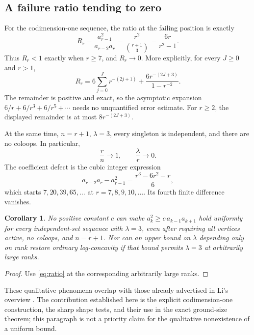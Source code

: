 \documentclass[11pt,letterpaper]{article}
\numberwithin{equation}{section}
\newtheorem{corollary}[theorem]{Corollary}
\theoremstyle{definition}
\theoremstyle{remark}
\begin{document}
\subsection{A failure ratio tending to zero}
For the codimension-one sequence, the ratio at the failing position is
exactly
\begin{equation}\label{eq:ratio}
 R_r=\frac{a_{r-1}^2}{a_{r-2}a_r}
 =\frac{r^2}{\binom{r+1}{3}}=\frac{6r}{r^2-1}.
\end{equation}
Thus $R_r<1$ exactly when $r\ge7$, and $R_r\to0$.
More explicitly, for every $J\ge0$ and $r>1$,
\begin{equation}\label{eq:asymptotic}
 R_r=6\sum_{j=0}^{J}r^{-(2j+1)}
       +\frac{6r^{-(2J+3)}}{1-r^{-2}}.
\end{equation}
The remainder is positive and exact, so the asymptotic expansion
$6/r+6/r^3+6/r^5+\cdots$ needs no unquantified error estimate.
For $r\ge2$, the displayed remainder is at most
$8r^{-(2J+3)}$.

At the same time, $n=r+1$, $\lambda=3$, every singleton is independent,
and there are no coloops. In particular,
\[
 \frac{r}{n}\longrightarrow1,\qquad \frac{\lambda}{r}\longrightarrow0.
\]
The coefficient defect is the cubic integer expression
\begin{equation}\label{eq:defectcubic}
 a_{r-2}a_r-a_{r-1}^2
 =\frac{r^3-6r^2-r}{6},
\end{equation}
which starts $7,20,39,65,\ldots$ at $r=7,8,9,10,\ldots$.
Its fourth finite difference vanishes.

\begin{corollary}\label{cor:nouniversal}
No positive constant $c$ can make
$a_k^2\ge c\,a_{k-1}a_{k+1}$ hold uniformly for every independent-set
sequence with $\lambda=3$, even after requiring all vertices active,
no coloops, and $n=r+1$.
Nor can an upper bound on $\lambda$ depending only on rank restore
ordinary log-concavity if that bound permits $\lambda=3$ at arbitrarily
large ranks.
\end{corollary}
\begin{proof}
Use \eqref{eq:ratio} at the corresponding arbitrarily large ranks.
\end{proof}

These qualitative phenomena overlap with those already advertised in
Li's overview \cite{Li}. The contribution established here is the explicit
codimension-one construction, the sharp shape tests, and their use in the
exact ground-size theorem; this paragraph is not a priority claim for the
qualitative nonexistence of a uniform bound.
\end{document}

